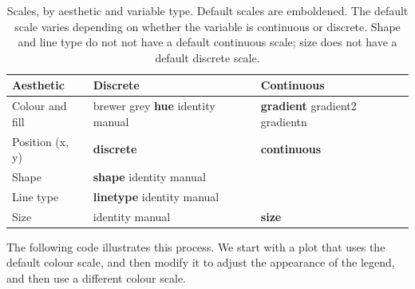\begin{table}
  \begin{center}
  \begin{tabular}{p{1in}p{1in}p{1in}}
    \toprule
    Aesthetic & Discrete & Continuous \\
    \midrule
    Colour and fill & brewer \newline grey \newline \textbf{hue} \newline identity \newline manual & \textbf{gradient} \newline gradient2 \newline gradientn \\[0.5em]
    Position (x, y) & \textbf{discrete} & \textbf{continuous} \\[0.5em]
    Shape & \textbf{shape} \newline identity \newline manual  \\[0.5em]
    Line type & \textbf{linetype} \newline identity \newline manual \\[0.5em]
    Size & identity \newline manual & \textbf{size} \\
    \bottomrule
  \end{tabular}
  \end{center}
  \caption{Scales, by aesthetic and variable type.  Default scales are emboldened. The default scale varies depending on whether the variable is continuous or discrete.  Shape and line type do not not have a default continuous scale; size does not have a default discrete scale.}
  \label{tbl:default-scales}
\end{table}

The following code illustrates this process.  We start with a plot that uses the default colour scale, and then modify it to adjust the appearance of the legend, and then use a different colour scale.

% 


% 

